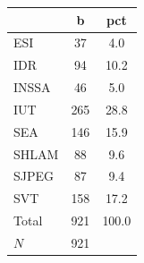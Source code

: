 {
\def\sym#1{\ifmmode^{#1}\else\(^{#1}\)\fi}
\begin{tabular}{l*{1}{cc}}
\toprule
            &           b&         pct\\
\midrule
ESI         &          37&         4.0\\
IDR         &          94&        10.2\\
INSSA       &          46&         5.0\\
IUT         &         265&        28.8\\
SEA         &         146&        15.9\\
SHLAM       &          88&         9.6\\
SJPEG       &          87&         9.4\\
SVT         &         158&        17.2\\
Total       &         921&       100.0\\
\midrule
\(N\)       &         921&            \\
\bottomrule
\end{tabular}
}
